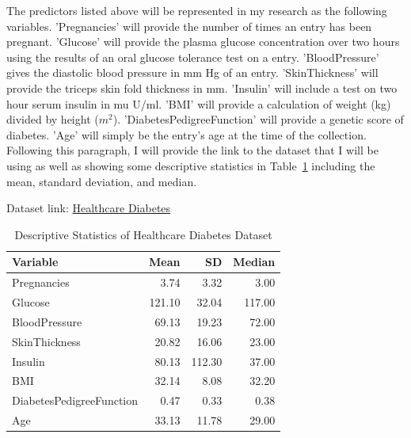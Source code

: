 \documentclass[12pt]{article}
\begin{document}
    The predictors listed above will be represented in my research as the following variables. 'Pregnancies' will provide the number of 
    times an entry has been pregnant. 'Glucose' will provide the plasma glucose concentration over two hours using the results of an oral 
    glucose tolerance test on a entry. 'BloodPressure' gives the diastolic blood pressure in mm Hg of an entry. 'SkinThickness' will 
    provide the triceps skin fold thickness in mm. 'Insulin' will include a test on two hour serum insulin in mu U/ml. 'BMI' will provide a 
    calculation of weight (kg) divided by height ($m^2$). 'DiabetesPedigreeFunction' will provide a genetic score of diabetes. 'Age' will 
    simply be the entry's age at the time of the collection. Following this paragraph, I will provide the link to the dataset that I will 
    be using as well as showing some descriptive statistics in Table~\ref{tab:ds} including the mean, standard deviation, and median.  

Dataset link: \href{https://www.kaggle.com/datasets/nanditapore/healthcare-diabetes}{Healthcare Diabetes}

\begin{table}[ht]
    \caption{Descriptive Statistics of Healthcare Diabetes Dataset}
  \label{tab:ds}
\centering
\begin{tabular}{lrrr}
      \hline
    Variable & Mean & SD & Median \\ 
      \hline
      Pregnancies & 3.74 & 3.32 & 3.00 \\ 
      Glucose & 121.10 & 32.04 & 117.00 \\ 
      BloodPressure & 69.13 & 19.23 & 72.00 \\ 
      SkinThickness & 20.82 & 16.06 & 23.00 \\ 
      Insulin & 80.13 & 112.30 & 37.00 \\ 
      BMI & 32.14 & 8.08 & 32.20 \\ 
      DiabetesPedigreeFunction & 0.47 & 0.33 & 0.38 \\ 
      Age & 33.13 & 11.78 & 29.00 \\ 
       \hline
    \end{tabular}
    \end{table}
  
\end{document}
